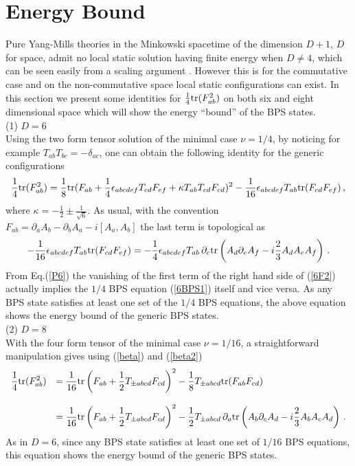 \documentclass[a4paper,11pt]{article}
\def\tr{{\rm tr}}
\begin{document}
\section{Energy Bound\label{ENERGY}}
Pure Yang-Mills theories in the Minkowski spacetime of the dimension $D+1$, $D$ for  space, admit no local static solution having finite energy
when  $D\neq 4$, which can be seen easily  from a  scaling argument \cite{jaffe}. However this is for the commutative case and on the non-commutative
space local static configurations can exist. In this section we present some identities for $\frac{1}{4}\tr(F_{ab}^{2})$ on both six and eight
dimensional space
which  will show the energy ``bound'' of the BPS states.\\

(1) $D=6$\\
Using  the two form tensor  solution of the minimal case $\nu={1/4}$, by noticing for example $T_{ab}T_{bc}=-\delta_{ac}$, one can obtain the
following identity for the generic configurations
\begin{equation}
\frac{1}{4}\tr( F_{ab}^{2})=\frac{1}{8}\tr(F_{ab}+\frac{1}{4}\epsilon_{abcdef}T_{cd}F_{ef}+\kappa
T_{ab}T_{cd}F_{cd})^{2}-\frac{1}{16}\epsilon_{abcdef}T_{ab}\tr (F_{cd}F_{ef})\,, \label{6F2}
\end{equation}
where $\kappa=-\frac{1}{2}\pm\frac{1}{\sqrt{6}}$.  As usual, with the convention
$F_{ab}=\partial_{a}A_{b}-\partial_{b}A_{a}-i[A_{a},A_{b}]$ the last term is topological as
\begin{equation}
-\frac{1}{16}\epsilon_{abcdef}T_{ab}\tr(F_{cd}F_{ef})=-\frac{1}{4}\epsilon_{abcdef}T_{ab}\,\partial_{c}
\tr\left(A_{d}\partial_{e}A_{f}-i\frac{2}{3}A_{d}A_{e}A_{f}\right)\,.
\end{equation}
From Eq.(\ref{P6}) the vanishing of the first term of the right hand side of (\ref{6F2}) actually implies the ${1/4}$ BPS equation (\ref{6BPS1})
itself and vice versa.  As any BPS state satisfies at least one set of the $1/4$ BPS equations,  the above equation shows the
energy bound of the generic BPS states.\\

(2) $D=8$\\
With the four form tensor of the minimal case $\nu={1/16}$, a straightforward manipulation gives using (\ref{beta}) and (\ref{beta2})
\begin{equation}
\begin{array}{ll}
\displaystyle{\frac{1}{4}\tr(F_{ab}^{2})}&=\displaystyle{\frac{1}{16}\tr\left(F_{ab}+\frac{1}{2}T_{\pm abcd}F_{cd}\right)^{2}
-\frac{1}{8}T_{\pm abcd}\tr(F_{ab}F_{cd})}\\ {}&{}\\
{}&\displaystyle{=\frac{1}{16}\tr\left(F_{ab}+\frac{1}{2}T_{\pm abcd}F_{cd}\right)^{2} -\frac{1}{2}T_{\pm abcd}\,\partial_{a}
\tr\left(A_{b}\partial_{c}A_{d}-i\frac{2}{3}A_{b}A_{c}A_{d}\right)\,.}
\end{array}
\end{equation}
As in $D=6$, since any BPS state satisfies at least one set of ${1/16}$ BPS equations,  this equation shows the energy bound of the generic BPS
states.
\end{document}
